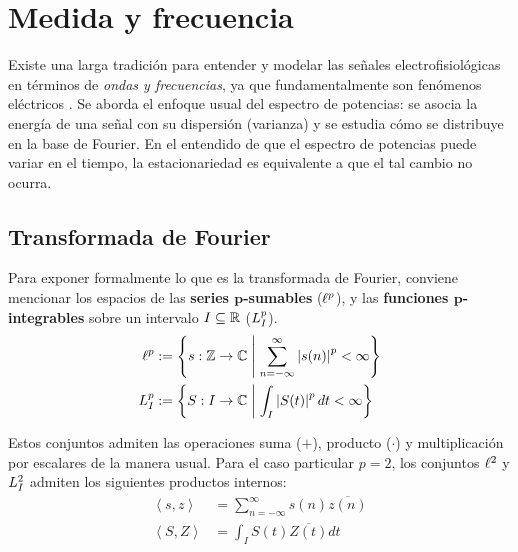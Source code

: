 
\chapter{Medida y frecuencia}

Existe una larga tradición para entender y modelar las señales electrofisiológicas en términos de 
\textit{ondas y frecuencias}, ya que fundamentalmente son fenómenos eléctricos \cite{Kaiser00}.
%
Se aborda el enfoque usual del espectro de potencias: se asocia la energía de una señal con su 
dispersión (varianza) y se estudia cómo se distribuye en la base de Fourier.
%
En el entendido de que el espectro de potencias puede variar en el tiempo, la estacionariedad
es equivalente a que el tal cambio no ocurra.



\section{Transformada de Fourier}

Para exponer formalmente lo que es la transformada de Fourier, conviene mencionar los espacios de 
las \textbf{series $\boldsymbol{p}$-sumables} ($\ell^{p}$), y las  \textbf{funciones 
$\boldsymbol{p}$-integrables} sobre un intervalo $I \subseteq \mathbb{R}$ ($L^{p}_I$).
\begin{align*}
\ell^{p} &:= \left\{ s: \mathbb{Z}\rightarrow\mathbb{C} \mathrel{}\middle|\mathrel{} \sum_{n=-\infty}^{\infty} \left| s(n) \right|^{p} < \infty \right\}
\\
L^{p}_I &:= \left\{ S: I\rightarrow\mathbb{C} \mathrel{}\middle|\mathrel{} \int_I \left| S(t) \right|^{p} dt < \infty \right\}
\end{align*}

Estos conjuntos admiten las operaciones  suma ($+$), producto ($\cdot$) y multiplicación por 
escalares de la manera usual.
%
Para el caso particular $p=2$, los conjuntos $\ell^{2}$ y $L^{2}_I$ admiten los siguientes productos 
internos:
%
\begin{align*}
\left\langle s,z \right\rangle &= \sum_{n=-\infty}^{\infty} s(n) \overline{z(n)}\\
\left\langle S,Z \right\rangle &= \int_I S(t) \overline{Z(t)} dt
\end{align*}

